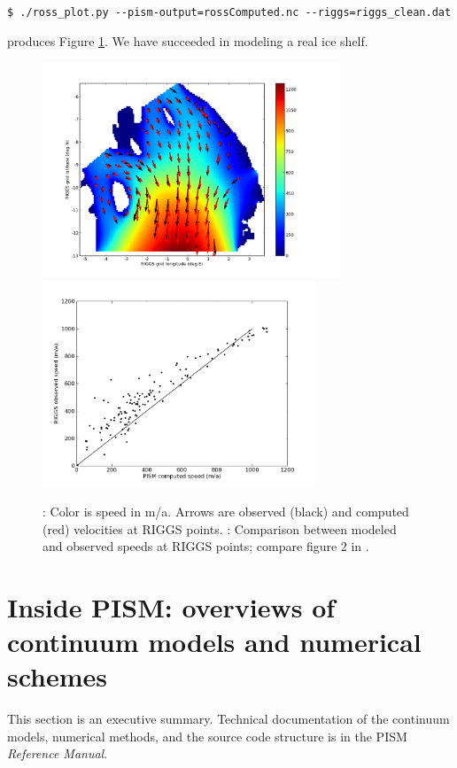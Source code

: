 \documentclass[11pt,final]{amsart}
\begin{document}
\verb|$ ./ross_plot.py --pism-output=rossComputed.nc --riggs=riggs_clean.dat|

\noindent produces Figure \ref{fig:rosspython}.  We have succeeded in modeling a real ice shelf.

\begin{figure}[ht]
\mbox{\includegraphics[width=3.5in,keepaspectratio=true]{figs/rossquiver}\, \includegraphics[width=3.2in,keepaspectratio=true]{figs/rossscatter}}
\caption{: Color is speed in m/a.  Arrows are observed (black) and computed (red) velocities at RIGGS points.  : Comparison between modeled and observed speeds at RIGGS points; compare figure 2 in \cite{MacAyealetal}.}
\label{fig:rosspython}
\end{figure}


\clearpage\newpage
\section{Inside PISM: overviews of continuum models and numerical schemes}\label{sect:over}

This section is an executive summary.  Technical documentation of the continuum models, numerical methods, and the source code structure is in the PISM \emph{Reference Manual}.
\end{document}
